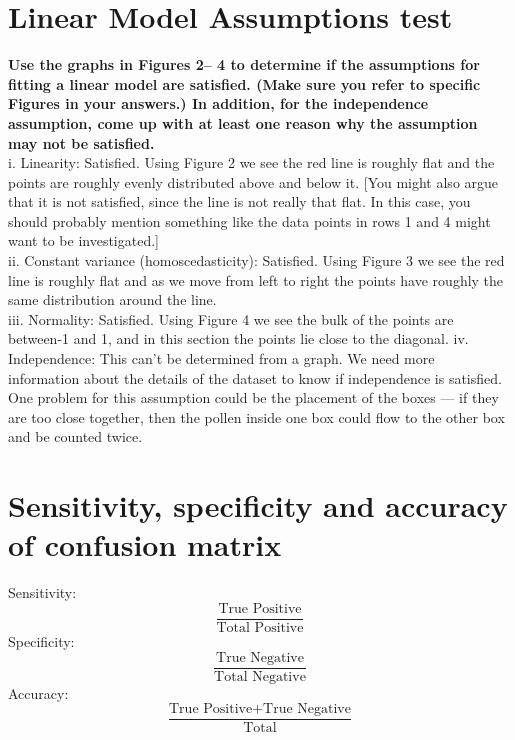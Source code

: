 \documentclass{article} %
\begin{document}
\section*{Linear Model Assumptions test}
\textbf{Use the graphs in Figures 2– 4 to determine if the assumptions for fitting a linear
model are satisfied. (Make sure you refer to specific Figures in your answers.) In
addition, for the independence assumption, come up with at least one reason why
the assumption may not be satisfied.}\\
i. Linearity: Satisfied. Using Figure 2 we see the red line is roughly flat and
the points are roughly evenly distributed above and below it. [You might
also argue that it is not satisfied, since the line is not really that flat. In
this case, you should probably mention something like the data points in
rows 1 and 4 might want to be investigated.] \\
ii. Constant variance (homoscedasticity): Satisfied. Using Figure 3 we see
the red line is roughly flat and as we move from left to right the points
have roughly the same distribution around the line. \\
iii. Normality: Satisfied. Using Figure 4 we see the bulk of the points are
between-1 and 1, and in this section the points lie close to the diagonal.
iv. Independence: This can’t be determined from a graph. We need more \\
information about the details of the dataset to know if independence is
satisfied. One problem for this assumption could be the placement of the
boxes — if they are too close together, then the pollen inside one box could
flow to the other box and be counted twice.

\section*{Sensitivity, specificity and accuracy of confusion matrix}
Sensitivity:
$$\frac{\text{True Positive}}{\text{Total Positive}}$$
Specificity: 
$$\frac{\text{True Negative}}{\text{Total Negative}}$$
Accuracy: 
$$\frac{\text{True Positive} + \text{True Negative}}{\text{Total}}$$
\end{document}
